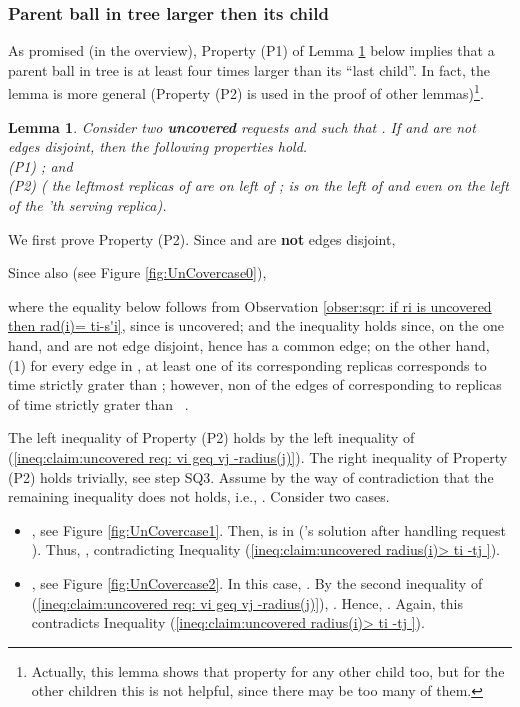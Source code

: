 \documentclass[11pt]{article}
\newtheorem{lem}[theorem]{Lemma}
\def\proof{\par\noindent{\bf Proof:~}}
\begin{document}
\subsubsection{Parent ball in tree larger then its child}

As promised (in the overview), Property (P1) of Lemma \ref{lemma:square:uncoverd req not edegs disjoint}
below implies that a parent ball in tree is at least four times larger than its ``last child''.
In fact, the lemma is more general (Property (P2) is used in the proof of other lemmas)\footnote{
Actually, this lemma shows that property for any other child too,
but for the other children this is not helpful, since there may be too many of them.
}.


\begin{lem}
Consider two {\bf uncovered} requests  and  such that .
If  and 
are not edges disjoint, then
the following properties hold.\\
(P1) ; and\\
(P2)  (
the leftmost replicas of  are on left of ;  is on the left of  and even on the left of the 'th serving replica).
\label{lemma:square:uncoverd req not edegs disjoint}
\end{lem}
\proof
We first prove Property (P2).
Since  and  are {\bf not} edges disjoint,

Since also  (see Figure \ref{fig:UnCovercase0}),

where the equality below follows from Observation \ref{obser:sqr: if ri is uncovered then rad(i)= ti-s'i},
since  is uncovered; and
the inequality holds since, on the one hand,   and  are not edge disjoint, hence has a common edge;
on the other hand, (1) for every edge in , at least one of its corresponding replicas corresponds to time strictly grater than ;
however, non of the edges of  corresponding to replicas of time strictly grater than ~.



The left inequality of Property (P2) holds by the left inequality of (\ref{ineq:claim:uncovered req: vi geq vj -radius(j)}).
The right inequality of Property (P2) holds trivially, see step SQ3.
Assume by the way of contradiction that the remaining inequality does not holds, i.e., .
Consider two cases.\\


\begin{itemize}

\item [{\bf Case 1.}] , see Figure \ref{fig:UnCovercase1}.
Then,  is in  ('s solution after handling request ).
Thus, , contradicting Inequality (\ref{ineq:claim:uncovered radius(i)> ti -tj }).

\item [{\bf Case 2.}]  , see Figure \ref{fig:UnCovercase2}.
In this case, .
By the second inequality of (\ref{ineq:claim:uncovered req: vi geq vj -radius(j)}), .
Hence, .
Again, this contradicts Inequality (\ref{ineq:claim:uncovered radius(i)> ti -tj }).

\end{itemize}
\end{document}
